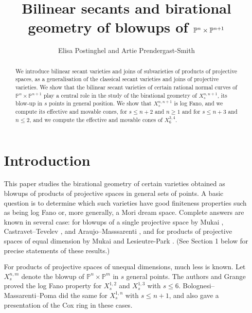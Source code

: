 \documentclass[a4paper,11pt]{article}
\title{Bilinear secants and birational geometry of blowups of $\PP^n \times \PP^{n+1}$}
\date{}
\author{Elisa Postinghel and Artie Prendergast-Smith}
\makeatletter
\newcommand{\PP}{\mathbb P}
\newcommand{\ourproduct}{\mathbb P^n \times \mathbb P^{n+1}}
\newcommand{\ourproductblowup}[1]{X^{n,n+1}_{#1}}
\newcommand{\subjclass}[2][1991]{%
  \let\@oldtitle\@title%
  \gdef\@title{\@oldtitle\footnotetext{#1 \emph{Mathematics Subject Classification.} #2}}%
}
\newcommand{\keywords}[1]{%
  \let\@@oldtitle\@title%
  \gdef\@title{\@@oldtitle\footnotetext{\emph{Key words and phrases.} #1.}}%
}
\makeatother
\begin{document}
\subjclass[2020]{14C20; 14J45; 14J70; 14N07}

\keywords{Effective cones, base locus lemmas, log Fano varieties, bilinear secant varieties}


\maketitle



\begin{abstract}

We introduce bilinear secant varieties and joins of subvarieties of  products of projective spaces, as a generalisation of the classical secant varieties and joins of projective varieties. 
%
We show that the bilinear secant varieties of certain rational normal curves of $\ourproduct$ play a central role in the study of the birational geometry of $\ourproductblowup{s}$, its blow-up in $s$ points in general position. We show that $\ourproductblowup{s}$ is log Fano, and we compute its effective and movable cones, for $s\le n+2$ and $n\ge1$ and for $s\le n+3$ and $n\le 2$, and  we compute the effective and movable cones of $X^{3,4}_6$. 
\end{abstract}

\section*{Introduction}


This paper studies the birational geometry of certain varieties obtained as blowups of products of projective spaces in general sets of points. A basic question is to determine which such varieties have good finiteness properties such as being log Fano or, more generally, a Mori dream space. Complete answers are known in several case: for blowups of a single projective space by Mukai \cite{Mukai04, Mukai05}, Castravet--Tevelev \cite{CT06}, and Araujo--Masssarenti \cite{AM16}, and for products of projective spaces of equal dimension by Mukai \cite{Mukai05} and Lesieutre-Park \cite{LP17}. (See Section 1 below for precise statements of these results.)

For products of projective spaces of unequal dimensions, much less is known. Let $X^{n,m}_s$ denote the blowup of $\PP^n \times \PP^m$ in $s$ general points.  The authors and Grange \cite{GPP21} proved the log Fano property for $X^{1,2}_s$ and $X^{1,3}_s$ with $s \leq 6$. Bolognesi--Massarenti--Poma \cite{bolognesi2023cox} did the same for $X^{1,n}_s$ with $s \leq n+1$, and also gave a presentation of the Cox ring in these cases.
\end{document}
